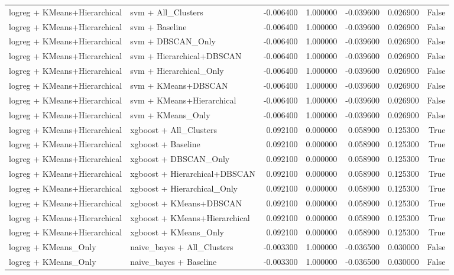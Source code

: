 \begin{tabular}{llrrrrr}
logreg + KMeans+Hierarchical & svm + All_Clusters & -0.006400 & 1.000000 & -0.039600 & 0.026900 & False \\
logreg + KMeans+Hierarchical & svm + Baseline & -0.006400 & 1.000000 & -0.039600 & 0.026900 & False \\
logreg + KMeans+Hierarchical & svm + DBSCAN_Only & -0.006400 & 1.000000 & -0.039600 & 0.026900 & False \\
logreg + KMeans+Hierarchical & svm + Hierarchical+DBSCAN & -0.006400 & 1.000000 & -0.039600 & 0.026900 & False \\
logreg + KMeans+Hierarchical & svm + Hierarchical_Only & -0.006400 & 1.000000 & -0.039600 & 0.026900 & False \\
logreg + KMeans+Hierarchical & svm + KMeans+DBSCAN & -0.006400 & 1.000000 & -0.039600 & 0.026900 & False \\
logreg + KMeans+Hierarchical & svm + KMeans+Hierarchical & -0.006400 & 1.000000 & -0.039600 & 0.026900 & False \\
logreg + KMeans+Hierarchical & svm + KMeans_Only & -0.006400 & 1.000000 & -0.039600 & 0.026900 & False \\
logreg + KMeans+Hierarchical & xgboost + All_Clusters & 0.092100 & 0.000000 & 0.058900 & 0.125300 & True \\
logreg + KMeans+Hierarchical & xgboost + Baseline & 0.092100 & 0.000000 & 0.058900 & 0.125300 & True \\
logreg + KMeans+Hierarchical & xgboost + DBSCAN_Only & 0.092100 & 0.000000 & 0.058900 & 0.125300 & True \\
logreg + KMeans+Hierarchical & xgboost + Hierarchical+DBSCAN & 0.092100 & 0.000000 & 0.058900 & 0.125300 & True \\
logreg + KMeans+Hierarchical & xgboost + Hierarchical_Only & 0.092100 & 0.000000 & 0.058900 & 0.125300 & True \\
logreg + KMeans+Hierarchical & xgboost + KMeans+DBSCAN & 0.092100 & 0.000000 & 0.058900 & 0.125300 & True \\
logreg + KMeans+Hierarchical & xgboost + KMeans+Hierarchical & 0.092100 & 0.000000 & 0.058900 & 0.125300 & True \\
logreg + KMeans+Hierarchical & xgboost + KMeans_Only & 0.092100 & 0.000000 & 0.058900 & 0.125300 & True \\
logreg + KMeans_Only & naive_bayes + All_Clusters & -0.003300 & 1.000000 & -0.036500 & 0.030000 & False \\
logreg + KMeans_Only & naive_bayes + Baseline & -0.003300 & 1.000000 & -0.036500 & 0.030000 & False \\

\end{tabular}
